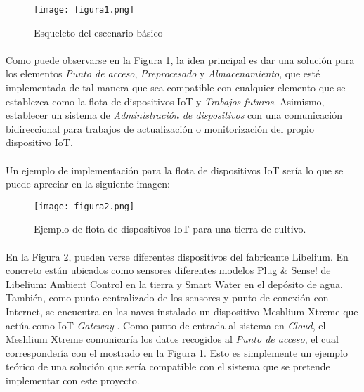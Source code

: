 \documentclass[../../memoria.tex]{subfiles}
\begin{document}
\begin{figure}[H]
    \centering
    \texttt{[image: figura1.png]}
    \caption{Esqueleto del escenario básico}
    \label{fig:figura1}
\end{figure}

\paragraph{}
Como puede observarse en la Figura 1, la idea principal es dar una solución para los elementos \textit{Punto de acceso}, \textit{Preprocesado} y \textit{Almacenamiento}, que esté implementada de tal manera que sea compatible con cualquier elemento que se establezca como la flota de dispositivos IoT y \textit{Trabajos futuros}. Asimismo, establecer un sistema de \textit{Administración de dispositivos} con una comunicación bidireccional para trabajos de actualización o monitorización del propio dispositivo IoT.

\paragraph{}
Un ejemplo de implementación para la flota de dispositivos IoT sería lo que se puede apreciar en la siguiente imagen:

\begin{figure}[H]
    \centering
    \texttt{[image: figura2.png]}
    \caption{Ejemplo de flota de dispositivos IoT para una tierra de cultivo.}
    \label{fig:figura2}
\end{figure}

\paragraph{}
En la Figura 2, pueden verse diferentes dispositivos del fabricante Libelium. En concreto están ubicados como sensores diferentes modelos Plug \& Sense! de Libelium: Ambient Control en la tierra y Smart Water en el depósito de agua. También, como punto centralizado de los sensores y punto de conexión con Internet, se encuentra en las naves instalado un dispositivo Meshlium Xtreme que actúa como IoT \textit{Gateway} \cite{libelium}. Como punto de entrada al sistema en \textit{Cloud}, el Meshlium Xtreme comunicaría los datos recogidos al \textit{Punto de acceso}, el cual correspondería con el mostrado en la Figura 1. Esto es simplemente un ejemplo teórico de una solución que sería compatible con el sistema que se pretende implementar con este proyecto.
\end{document}
